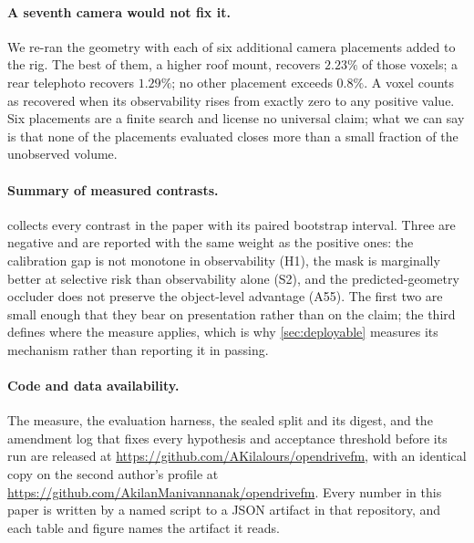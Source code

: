 \documentclass[10pt,twocolumn,letterpaper]{article}
\begin{document}
\paragraph{A seventh camera would not fix it.} We
re-ran the geometry with each of six additional camera placements added to
the rig. The best of them, a higher roof mount, recovers $2.23\%$ of those
voxels; a rear telephoto recovers $1.29\%$; no other placement exceeds
$0.8\%$. A voxel counts as recovered when its observability rises from exactly zero
to any positive value. Six placements are a finite search and license no
universal claim; what we can say is that none of the placements evaluated
closes more than a small fraction of the unobserved volume.

\paragraph{Summary of measured contrasts.}
 collects every contrast in the paper with its paired
bootstrap interval. Three are negative and are reported with the same
weight as the positive ones: the calibration gap is not monotone in
observability (H1), the mask is marginally better at selective risk than
observability alone (S2), and the predicted-geometry occluder does not
preserve the object-level advantage (A55). The first two are small enough
that they bear on presentation rather than on the claim; the third defines
where the measure applies, which is why \cref{sec:deployable} measures its
mechanism rather than reporting it in passing.





\paragraph{Code and data availability.} The measure, the evaluation harness,
the sealed split and its digest, and the amendment log that fixes every
hypothesis and acceptance threshold before its run are released at
\url{https://github.com/AKilalours/opendrivefm}, with an identical copy on
the second author's profile at
\url{https://github.com/AkilanManivannanak/opendrivefm}. Every number in this
paper is written by a named script to a JSON artifact in that repository, and
each table and figure names the artifact it reads.
\end{document}
